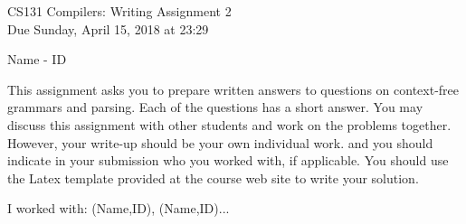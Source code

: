 \documentclass[10pt]{article}
\begin{document}
\begin{center}
\Large CS131 Compilers: Writing Assignment 2\\Due Sunday, April 15, 2018 at 23:29
\end{center}

\begin{center}
\LARGE Name - ID
\end{center}

This assignment asks you to prepare written answers to questions on
context-free grammars and parsing. Each of the questions has a short answer. You
may discuss this assignment with other students and work on the problems
together. However, your write-up should be your own individual work.
and you should indicate in your submission who you worked with, if applicable.
You should use the Latex template provided at the course web site to write your solution.

\begin{center}
I worked with: (Name,ID), (Name,ID)...
\end{center}
\end{document}
